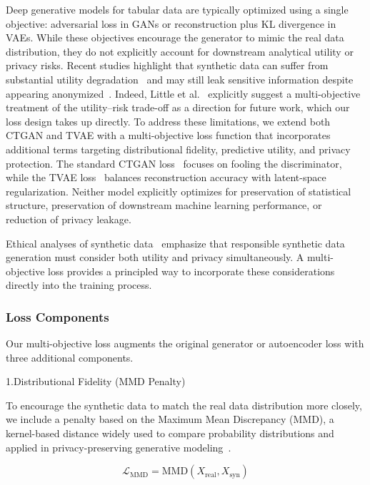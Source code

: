 \documentclass[11pt]{article}
\begin{document}
Deep generative models for tabular data are typically optimized using a single objective: adversarial loss in GANs or reconstruction plus KL divergence in VAEs. While these objectives encourage the generator to mimic the real data distribution, they do not explicitly account for downstream analytical utility or privacy risks. Recent studies highlight that synthetic data can suffer from substantial utility degradation~\cite{little2025synthetic} and may still leak sensitive information despite appearing anonymized~\cite{stadler2022synthetic}. Indeed, Little et al.~\cite{little2025synthetic} explicitly suggest a multi-objective treatment of the utility--risk trade-off as a direction for future work, which our loss design takes up directly. To address these limitations, we extend both CTGAN and TVAE with a multi-objective loss function that incorporates additional terms targeting distributional fidelity, predictive utility, and privacy protection.
The standard CTGAN loss~\cite{xu2019modeling} focuses on fooling the discriminator, while the TVAE loss~\cite{xu2018synthesizing} balances reconstruction accuracy with latent-space regularization. Neither model explicitly optimizes for preservation of statistical structure, preservation of downstream machine learning performance, or reduction of privacy leakage.

Ethical analyses of synthetic data~\cite{leslie2020ethics, floridi2016data} emphasize that responsible synthetic data generation must consider both utility and privacy simultaneously. A multi-objective loss provides a principled way to incorporate these considerations directly into the training process.

\subsubsection{Loss Components}

Our multi-objective loss augments the original generator or autoencoder loss with three additional components.

1.Distributional Fidelity (MMD Penalty) 

To encourage the synthetic data to match the real data distribution more closely, we include a penalty based on the Maximum Mean Discrepancy (MMD), a kernel-based distance widely used to compare probability distributions and applied in privacy-preserving generative modeling~\cite{jordon2018pategan}.

\begin{equation}
\mathcal{L}_{\text{MMD}} = \text{MMD}(X_{\text{real}}, X_{\text{syn}})
\end{equation}
\end{document}
